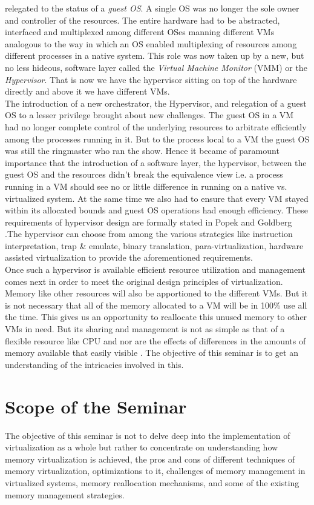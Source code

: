 relegated to the status of a \textit{guest OS}. A single OS was no longer the sole owner and
controller of the resources. The entire hardware had to be abstracted, interfaced and multiplexed
among different OSes manning different VMs analogous to the way in which an OS enabled
multiplexing of resources among different processes in a native system. This role was now taken up
by a new, but no less hideous, software layer called the \textit{Virtual Machine Monitor} (VMM) or
the \textit{Hypervisor}. That is now we have the hypervisor sitting on top of the hardware 
directly and above it we have different VMs.\\
The introduction of a new orchestrator, the Hypervisor, and relegation of a guest OS to a lesser
privilege brought about new challenges. The guest OS in a VM had no longer complete control of the
underlying resources to arbitrate efficiently among the processes running in it. But to the
process local to a VM the guest OS was still the ringmaster who ran the show. Hence it became of
paramount importance that the introduction of a software layer, the hypervisor, between the guest
OS and the resources didn't break the equivalence view  i.e. a process running in a VM should see
no or little difference in running on a native vs. virtualized system. At the same time we also
had to ensure that every VM stayed within its allocated bounds and guest OS operations had enough
efficiency. These requirements of hypervisor design are formally stated in Popek and Goldberg
\citep{Popek1974}.The hypervisor can choose from among the various strategies like instruction
interpretation, trap \& emulate, binary translation, para-virtualization, hardware assisted
virtualization to provide the aforementioned requirements.\\
Once such a hypervisor is available efficient resource utilization and management comes next in
order to meet the original design principles of virtualization. Memory like other
resources will also be apportioned to the different VMs. But it is not necessary that all  of the
memory allocated to a VM will be in 100\% use all the time. This gives us an opportunity to
reallocate this unused memory to other VMs in need. But its sharing and management is not as
simple as that of a flexible resource like CPU and nor are the effects of differences in the
amounts of memory available that easily visible \citep{Mortar2014}. The objective of this seminar
is to get an understanding of the intricacies involved in this. 

\section{Scope of the Seminar}
The objective of this seminar is not to delve deep into the implementation of virtualization as a
whole but rather to concentrate on understanding how memory virtualization is achieved, the pros and cons of different techniques of memory virtualization, optimizations to it, challenges of memory management in virtualized systems, memory reallocation mechanisms, and some of the existing memory management strategies.     

